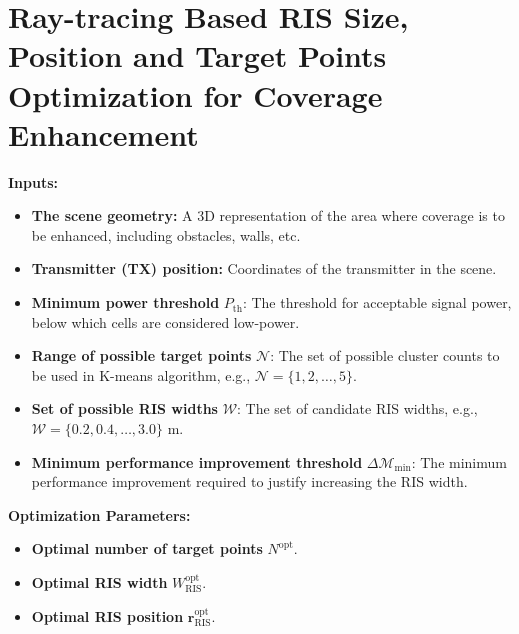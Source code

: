 \documentclass{article}
\begin{document}
	
\section*{Ray-tracing Based RIS Size, Position and Target Points Optimization for Coverage Enhancement}

\noindent \textbf{Inputs:}
\begin{itemize}
	\item \textbf{The scene geometry:} A 3D representation of the area where coverage is to be enhanced, including obstacles, walls, etc.
	\item \textbf{Transmitter (TX) position:} Coordinates of the transmitter in the scene.
	\item \textbf{Minimum power threshold} $P_{\text{th}}$: The threshold for acceptable signal power, below which cells are considered low-power.
	\item \textbf{Range of possible target points} $\mathcal{N}$: The set of possible cluster counts to be used in K-means algorithm, e.g., $\mathcal{N} = \{1, 2, \dots, 5\}$.
	\item \textbf{Set of possible RIS widths} $\mathcal{W}$: The set of candidate RIS widths, e.g., $\mathcal{W} = \{0.2, 0.4, \dots, 3.0\}$ m.
	\item \textbf{Minimum performance improvement threshold} $\Delta \mathcal{M}_{\text{min}}$: The minimum performance improvement required to justify increasing the RIS width.
\end{itemize}

\noindent \textbf{Optimization Parameters:}
\begin{itemize}
	\item \textbf{Optimal number of target points} $N^{\text{opt}}$.
	\item \textbf{Optimal RIS width} $W_{\text{RIS}}^{\text{opt}}$.
	\item \textbf{Optimal RIS position} $\mathbf{r}_{\text{RIS}}^{\text{opt}}$.
\end{itemize}
\end{document}

